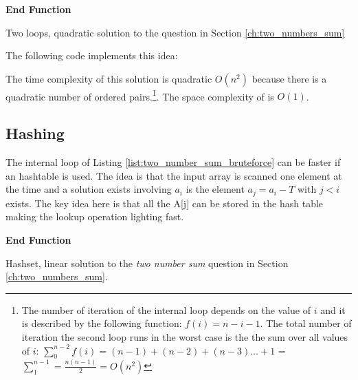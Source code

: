 \begin{algorithm}
	\SetAlgoLined {}
	
	 

	\textbf{End Function}
	
	\label{algo:two_number_sum_bruteforce}
	\caption{Two loops, quadratic solution to the question in Section \ref{ch:two_numbers_sum} }
\end{algorithm}
The following code implements this idea:



The time complexity of this solution is quadratic $O(n^2)$ because there is a quadratic number of
ordered pairs.\footnote{The number of iteration of the internal loop depends on the value of $i$ and
it is described by the following function: $f(i) = n-i-1$. The total number of iteration the second
loop runs in the worst case is the the sum over all values of $i$: $\sum_{0}^{n-2}f(i) = (n-1) +
(n-2) + (n-3) \dots + 1$ = $\sum_{1}^{n-1} = \frac{n(n-1)}{2} = O(n^2)$}. The space complexity of is
$O(1)$.

\subsection{Hashing}
\label{sec:two_numbers:hashing}
The internal loop of Listing \ref{list:two_number_sum_bruteforce} can be faster if an hashtable is
used. The idea is that the input array is scanned one element at the time and a solution exists
involving $a_i$ is the element $a_j  = a_i-T$ with $j < i$ exists. The key idea here is that all the
A[j] can be stored in the hash table making the lookup operation lighting fast. 

\begin{algorithm}
	   
	
    \textbf{End Function}

	\label{algo:two_number_sum_hashset}
	\caption{Hashset, linear solution to the \textit{two number sum} question in Section
	\ref{ch:two_numbers_sum}.}
\end{algorithm}



